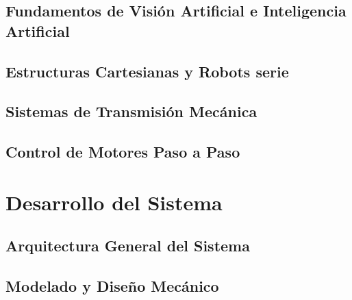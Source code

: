 \documentclass[a4paper,12pt]{report}
\begin{document}
\section{Fundamentos de Visión Artificial e Inteligencia Artificial}






\section{Estructuras Cartesianas y Robots serie}


\section{Sistemas de Transmisión Mecánica}


\section{Control de Motores Paso a Paso}

%
%

\chapter{Desarrollo del Sistema}

\section{Arquitectura General del Sistema}





\section{Modelado y Diseño Mecánico}
\end{document}
